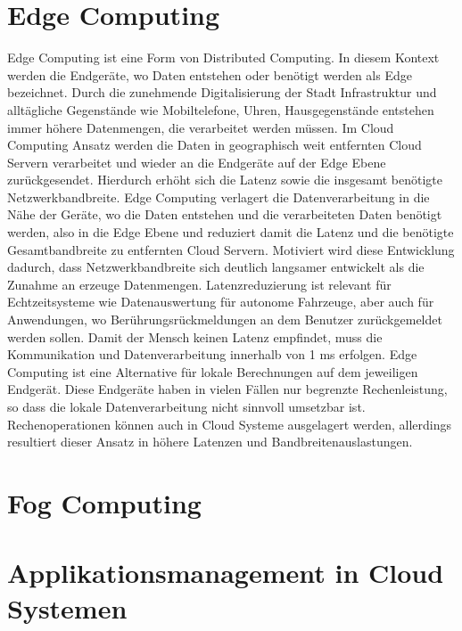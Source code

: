 \section{Edge Computing}

Edge Computing ist eine Form von Distributed Computing. In diesem Kontext werden die Endgeräte, wo Daten entstehen oder benötigt werden als Edge bezeichnet. Durch die zunehmende Digitalisierung der Stadt Infrastruktur und alltägliche Gegenstände wie Mobiltelefone, Uhren, Hausgegenstände entstehen immer höhere Datenmengen, die verarbeitet werden müssen. Im Cloud Computing Ansatz werden die Daten in geographisch weit entfernten Cloud Servern verarbeitet und wieder an die Endgeräte auf der Edge Ebene zurückgesendet. Hierdurch erhöht sich die Latenz sowie die insgesamt benötigte Netzwerkbandbreite. Edge Computing verlagert die Datenverarbeitung in die Nähe der Geräte, wo die Daten entstehen und die verarbeiteten Daten benötigt werden, also in die Edge Ebene und reduziert damit die Latenz und die benötigte Gesamtbandbreite zu entfernten Cloud Servern. \cite{Wang2019} Motiviert wird diese Entwicklung dadurch, dass Netzwerkbandbreite sich deutlich langsamer entwickelt als die Zunahme an erzeuge Datenmengen.\cite{Shi2016} Latenzreduzierung ist relevant für Echtzeitsysteme wie Datenauswertung für autonome Fahrzeuge, aber auch für Anwendungen, wo Berührungsrückmeldungen an dem Benutzer zurückgemeldet werden sollen. Damit der Mensch keinen Latenz empfindet, muss die Kommunikation und Datenverarbeitung innerhalb von 1 ms erfolgen. \cite{Varsha2017} Edge Computing ist eine Alternative für lokale Berechnungen auf dem jeweiligen Endgerät. Diese Endgeräte haben in vielen Fällen nur begrenzte Rechenleistung, so dass die lokale Datenverarbeitung nicht sinnvoll umsetzbar ist. Rechenoperationen können auch in Cloud Systeme ausgelagert werden, allerdings resultiert dieser Ansatz in höhere Latenzen und Bandbreitenauslastungen. \cite{Lin2020} 

\section{Fog Computing}



\section{Applikationsmanagement in Cloud Systemen}
\label{Applikationsmanagement}

